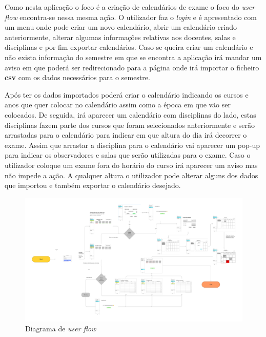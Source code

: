 \documentclass[11pt, twoside]{report}
\begin{document}
	Como nesta aplicação o foco é a criação de calendários de exame o foco do \textit{user flow} encontra-se nessa mesma ação. O utilizador faz o \textit{login} e é apresentado com um menu onde pode criar um novo calendário, abrir um calendário criado anteriormente, alterar algumas informações relativas aos docentes, salas e disciplinas e por fim exportar calendários.
	Caso se queira criar um calendário e não exista informação do semestre em que se encontra a aplicação irá mandar um aviso em que poderá ser redirecionado para a página onde irá importar o ficheiro \textbf{csv} com os dados necessários para o semestre.
	
	Após ter os dados importados poderá criar o calendário indicando os cursos e anos que quer colocar no calendário assim como a época em que vão ser colocados.
	De seguida, irá aparecer um calendário com disciplinas do lado, estas disciplinas fazem parte dos cursos que foram selecionados anteriormente e serão arrastadas para o calendário para indicar em que altura do dia irá decorrer o exame.
	Assim que arrastar a disciplina para o calendário vai aparecer um pop-up para indicar os observadores e salas que serão utilizadas para o exame.
	Caso o utilizador coloque um exame fora do horário do curso irá aparecer um aviso mas não impede a ação.
	A qualquer altura o utilizador pode alterar alguns dos dados que importou e também exportar o calendário desejado.

	\begin{landscape}
		\pagestyle{empty}
		\begin{figure}[H] 
			\centering 							\includegraphics[width=1.5\textwidth,height=1.5\textheight,keepaspectratio]{image/diagramauserflow}
			\caption{Diagrama de \textit{user flow}}
		\end{figure}
	\end{landscape}
\end{document}
